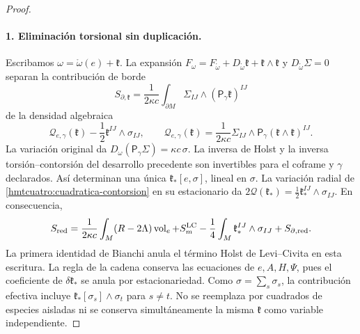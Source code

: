 \begin{proof}
\paragraph{1. Eliminación torsional sin duplicación.}
Escribamos \(\omega=\mathring\omega(e)+\mathfrak k\).
La expansión \(F_\omega=F_{\mathring\omega}
+D_{\mathring\omega}\mathfrak k+\mathfrak k\wedge\mathfrak k\)
y \(D_{\mathring\omega}\Sigma=0\) separan la contribución de borde
\[
 S_{\partial,\mathfrak k}
 =\frac1{2\kappa c}\int_{\partial M}
                  \Sigma_{IJ}\wedge(\mathsf P_\gamma\mathfrak k)^{IJ}
\]
de la densidad algebraica
\begin{equation}
 \mathcal Q_{e,\gamma}(\mathfrak k)
       -\frac12\mathfrak k^{IJ}\wedge\sigma_{IJ},\qquad
 \mathcal Q_{e,\gamma}(\mathfrak k)=\frac1{2\kappa c}
       \Sigma_{IJ}\wedge
       \mathsf P_\gamma(\mathfrak k\wedge\mathfrak k)^{IJ}.
 \label{hmtcuatro:cuadratica-contorsion}
\end{equation}
La variación original da
\(D_\omega(\mathsf P_\gamma\Sigma)=\kappa c\,\sigma\).
La inversa de Holst y la inversa torsión--contorsión del desarrollo
precedente son invertibles para el coframe y \(\gamma\) declarados.
Así determinan una única \(\mathfrak k_*[e,\sigma]\), lineal en
\(\sigma\). La variación radial de
\eqref{hmtcuatro:cuadratica-contorsion} en su estacionario da
\(2\mathcal Q(\mathfrak k_*)=\frac12\mathfrak k_*^{IJ}\wedge\sigma_{IJ}\).
En consecuencia,
\begin{equation}
 S_{\rm red}=\frac1{2\kappa c}\int_M(R-2\Lambda)\operatorname{vol}_e
       +S_m^{\rm LC}
       -\frac14\int_M\mathfrak k_*^{IJ}\wedge\sigma_{IJ}
       +S_{\partial,\rm red}.
 \label{hmtcuatro:accion-reducida}
\end{equation}
La primera identidad de Bianchi anula el término Holst de
Levi--Civita en esta escritura. La regla de la cadena conserva las
ecuaciones de \(e,A,H,\Psi\), pues el coeficiente de
\(\delta\mathfrak k_*\) se anula por estacionariedad.
Como \(\sigma=\sum_s\sigma_s\), la contribución efectiva incluye
\(\mathfrak k_*[\sigma_s]\wedge\sigma_t\) para \(s\ne t\).
No se reemplaza por cuadrados de especies aisladas ni se conserva
simultáneamente la misma \(\mathfrak k\) como variable independiente.


\end{proof}
